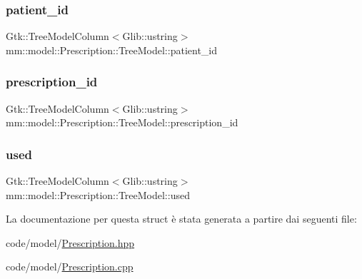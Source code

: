 \subsubsection{\texorpdfstring{patient\+\_\+id}{patient\_id}}
{\footnotesize\ttfamily Gtk\+::\+Tree\+Model\+Column$<$Glib\+::ustring$>$ mm\+::model\+::\+Prescription\+::\+Tree\+Model\+::patient\+\_\+id}

\mbox{\label{structmm_1_1model_1_1_prescription_1_1_tree_model_ab9c6e53985f8fba26f6b423ba4e3e12c}} 
\subsubsection{\texorpdfstring{prescription\+\_\+id}{prescription\_id}}
{\footnotesize\ttfamily Gtk\+::\+Tree\+Model\+Column$<$Glib\+::ustring$>$ mm\+::model\+::\+Prescription\+::\+Tree\+Model\+::prescription\+\_\+id}

\mbox{\label{structmm_1_1model_1_1_prescription_1_1_tree_model_abaa5eab3650e690c64385bd364526250}} 
\subsubsection{\texorpdfstring{used}{used}}
{\footnotesize\ttfamily Gtk\+::\+Tree\+Model\+Column$<$Glib\+::ustring$>$ mm\+::model\+::\+Prescription\+::\+Tree\+Model\+::used}



La documentazione per questa struct è stata generata a partire dai seguenti file\+:\begin{DoxyCompactItemize}
\item 
code/model/\hyperlink{_prescription_8hpp}{Prescription.\+hpp}\item 
code/model/\hyperlink{_prescription_8cpp}{Prescription.\+cpp}\end{DoxyCompactItemize}
